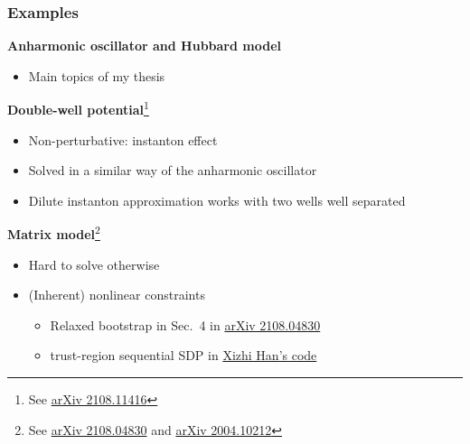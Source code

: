 \documentclass{beamer}
\begin{document}
\begin{frame}
\frametitle{Examples}

\textbf{Anharmonic oscillator and Hubbard model}

\begin{itemize}
    \item Main topics of my thesis
\end{itemize}

\textbf{Double-well potential}\footnote{See \href{https://arxiv.org/abs/2108.11416}{arXiv 2108.11416}}

\begin{itemize}
    \item Non-perturbative: instanton effect
    \item Solved in a similar way of the anharmonic oscillator
    \item Dilute instanton approximation works with two wells well separated
\end{itemize}

\textbf{Matrix model}\footnote{See \href{https://arxiv.org/pdf/2108.04830.pdf}{arXiv 2108.04830} and \href{https://arxiv.org/abs/2004.10212}{arXiv 2004.10212}}

\begin{itemize}
    \item Hard to solve otherwise
    \item (Inherent) nonlinear constraints
    \begin{itemize}
        \item Relaxed bootstrap in Sec.~4 in \href{https://arxiv.org/pdf/2108.04830.pdf}{arXiv 2108.04830}
        \item trust-region sequential SDP in \href{https://github.com/hanxzh94/matrix-bootstrap}{Xizhi Han's code}
    \end{itemize}
\end{itemize}

\end{frame}
\end{document}
